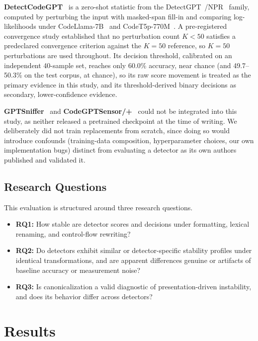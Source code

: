 \documentclass[sigconf,review,anonymous]{acmart}
\begin{document}
\textbf{DetectCodeGPT}~\cite{detectcodegpt} is a zero-shot statistic from the DetectGPT~\cite{detectgpt}/NPR~\cite{detectllm} family, computed by perturbing the input with masked-span fill-in and comparing log-likelihoods under CodeLlama-7B~\cite{codellama} and CodeT5p-770M~\cite{codet5plus}. A pre-registered convergence study established that no perturbation count $K{<}50$ satisfies a predeclared convergence criterion against the $K{=}50$ reference, so $K{=}50$ perturbations are used throughout. Its decision threshold, calibrated on an independent 40-sample set, reaches only 60.0\% accuracy, near chance (and 49.7--50.3\% on the test corpus, at chance), so its raw score movement is treated as the primary evidence in this study, and its threshold-derived binary decisions as secondary, lower-confidence evidence.

\textbf{GPTSniffer}~\cite{gptsniffer} and \textbf{CodeGPTSensor/+}~\cite{codegptsensor} could not be integrated into this study, as neither released a pretrained checkpoint at the time of writing. We deliberately did not train replacements from scratch, since doing so would introduce confounds (training-data composition, hyperparameter choices, our own implementation bugs) distinct from evaluating a detector as its own authors published and validated it.

\subsection{Research Questions}

This evaluation is structured around three research questions.
\begin{itemize}
\item \textbf{RQ1:} How stable are detector scores and decisions under formatting, lexical renaming, and control-flow rewriting?
\item \textbf{RQ2:} Do detectors exhibit similar or detector-specific stability profiles under identical transformations, and are apparent differences genuine or artifacts of baseline accuracy or measurement noise?
\item \textbf{RQ3:} Is canonicalization a valid diagnostic of presentation-driven instability, and does its behavior differ across detectors?
\end{itemize}

\section{Results}
\end{document}
